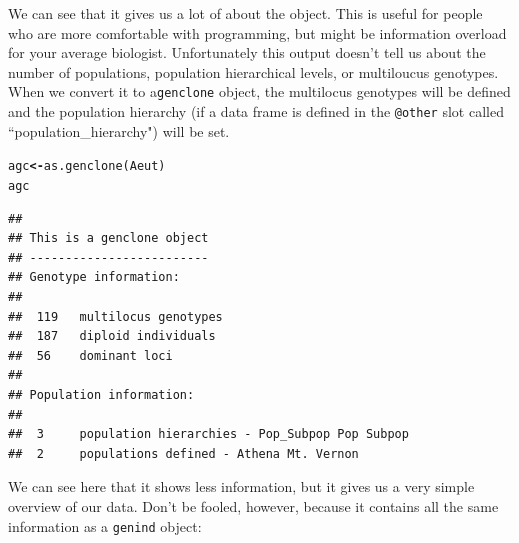 \documentclass[letterpaper]{article}\usepackage[]{graphicx}\usepackage[]{color}
\makeatletter
\newcommand{\hlstd}[1]{\textcolor[rgb]{0,0,0}{#1}}%
\newcommand{\hlkwb}[1]{\textcolor[rgb]{0.502,0.502,0.753}{\textbf{#1}}}%
\newcommand{\hlkwd}[1]{\textcolor[rgb]{0,0.267,0.4}{#1}}%
\newenvironment{kframe}{%
 \def\at@end@of@kframe{}%
 \ifinner\ifhmode%
  \def\at@end@of@kframe{\end{minipage}}%
  \begin{minipage}{\columnwidth}%
 \fi\fi%
 \def\FrameCommand##1{\hskip\@totalleftmargin \hskip-\fboxsep
 \colorbox{shadecolor}{##1}\hskip-\fboxsep
     \hskip-\linewidth \hskip-\@totalleftmargin \hskip\columnwidth}%
 \MakeFramed {\advance\hsize-\width
   \@totalleftmargin\z@ \linewidth\hsize
   \@setminipage}}%
 {\par\unskip\endMakeFramed%
 \at@end@of@kframe}
\newenvironment{knitrout}{}{} %
\makeatother
\begin{document}
We can see that it gives us a lot of about the object. This is useful for people
who are more comfortable with programming, but might be information overload for
your average biologist. Unfortunately this output doesn't tell us about the 
number of populations, population hierarchical levels, or multiloucus genotypes. 
When we convert it to a\texttt{genclone} object, the multilocus genotypes will
be defined and the population hierarchy (if a data frame is defined in the 
\texttt{@other} slot called ``population\_hierarchy") will be set.

\begin{knitrout}\footnotesize
{}\color{fgcolor}\begin{kframe}
\begin{alltt}
\hlstd{agc} \hlkwb{<-} \hlkwd{as.genclone}\hlstd{(Aeut)}
\hlstd{agc}
\end{alltt}
\begin{verbatim}
## 
## This is a genclone object
## -------------------------
## Genotype information:
## 
##  119   multilocus genotypes
##  187   diploid individuals
##  56    dominant loci
## 
## Population information:
## 
##  3     population hierarchies - Pop_Subpop Pop Subpop
##  2     populations defined - Athena Mt. Vernon
\end{verbatim}
\end{kframe}
\end{knitrout}


We can see here that it shows less information, but it gives us a very simple
overview of our data. Don't be fooled, however, because it contains all the same
information as a \texttt{genind} object:
\end{document}
